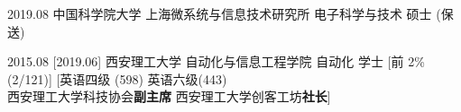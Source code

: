 \begin{educations}
    \education%
    {2019.08}%
    {中国科学院大学}%
    {上海微系统与信息技术研究所}%
    {电子科学与技术}%
    {硕士 (保送)}

    \separator{0.5ex}
    \education%
    {2015.08}%
    [2019.06]%
    {西安理工大学}%
    {自动化与信息工程学院}%
    {自动化}%
    {学士}
    [前 2\% (2/121)]
    [英语四级 (598) \textbullet 英语六级(443) \\
    西安理工大学科技协会\textbf{副主席} \textbullet 西安理工大学创客工坊\textbf{社长}]
\end{educations}